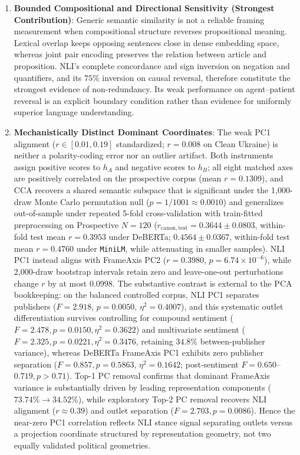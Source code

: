 \begin{enumerate}
    \item \textbf{Bounded Compositional and Directional Sensitivity (Strongest Contribution)}: Generic semantic similarity is not a reliable framing measurement when compositional structure reverses propositional meaning. Lexical overlap keeps opposing sentences close in dense embedding space, whereas joint pair encoding preserves the relation between article and proposition. NLI's complete concordance and sign inversion on negation and quantifiers, and its $75\%$ inversion on causal reversal, therefore constitute the strongest evidence of non-redundancy. Its weak performance on agent--patient reversal is an explicit boundary condition rather than evidence for uniformly superior language understanding.
    \item \textbf{Mechanistically Distinct Dominant Coordinates}: The weak PC1 alignment ($r \in [0.01,0.19]$ standardized; $r=0.008$ on Clean Ukraine) is neither a polarity-coding error nor an outlier artifact. Both instruments assign positive scores to $h_A$ and negative scores to $h_B$; all eight matched axes are positively correlated on the prospective corpus (mean $r=0.1309$), and CCA recovers a shared semantic subspace that is significant under the 1,000-draw Monte Carlo permutation null ($p = 1/1001 \approx 0.0010$) and generalizes out-of-sample under repeated 5-fold cross-validation with train-fitted preprocessing on Prospective $N=120$ ($r_{\mathrm{canon,test}}=0.3644 \pm 0.0803$, within-fold test mean $r = 0.3953$ under DeBERTa; $0.4564 \pm 0.0367$, within-fold test mean $r = 0.4760$ under \texttt{MiniLM}, while attenuating in smaller samples). NLI PC1 instead aligns with FrameAxis PC2 ($r=0.3980$, $p=6.74 \times 10^{-6}$), while 2,000-draw bootstrap intervals retain zero and leave-one-out perturbations change $r$ by at most $0.0998$. The substantive contrast is external to the PCA bookkeeping: on the balanced controlled corpus, NLI PC1 separates publishers ($F=2.918$, $p=0.0050$, $\eta^2=0.4007$), and this systematic outlet differentiation survives controlling for compound sentiment ($F=2.478, p=0.0150, \eta^2=0.3622$) and multivariate sentiment ($F=2.325, p=0.0221, \eta^2=0.3476$, retaining $34.8\%$ between-publisher variance), whereas DeBERTa FrameAxis PC1 exhibits zero publisher separation ($F=0.857, p=0.5863$, $\eta^2=0.1642$; post-sentiment $F=0.650$--$0.719, p>0.71$). Top-1 PC removal confirms that dominant FrameAxis variance is substantially driven by leading representation components ($73.74\% \to 34.52\%$), while exploratory Top-2 PC removal recovers NLI alignment ($r \approx 0.39$) and outlet separation ($F=2.703, p=0.0086$). Hence the near-zero PC1 correlation reflects NLI stance signal separating outlets versus a projection coordinate structured by representation geometry, not two equally validated political geometries.

\end{enumerate}

